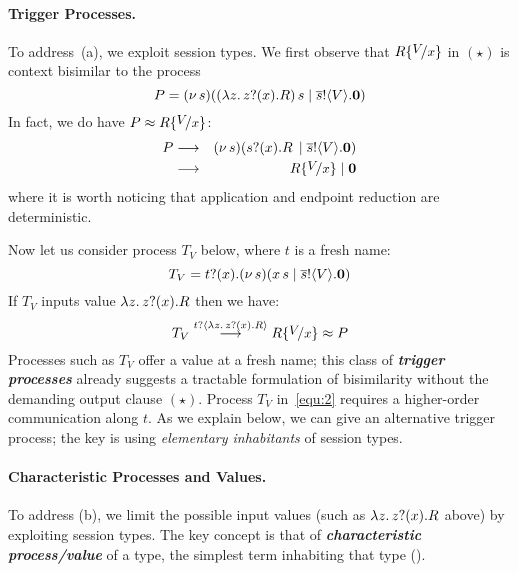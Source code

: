 \paragraph{Trigger Processes.} %
To address~(a), we exploit session types. 
We first 
observe that %
$R\subst{V}{x}$ 
in $(\star)$
is context bisimilar to the process
	$$P = (\nu\, s)((\lambda z.\,z ? (x) .{R})\, {s} \;|\; \overline{s} ! \langle V \rangle . \mathbf{0})$$
In fact,
we do have $P \wbc R\subst{V}{x}$:
\begin{eqnarray*}%
	P & \red &  \newsp{s}{\appl{\binp{s}{x}{R}} \Par \bout{\dual{s}}{V} \inact} \\
	 & \red &  R\subst{V}{x} \Par \inact
\end{eqnarray*}
where it is worth noticing that 
application and endpoint reduction
are deterministic.  

Now let us
consider process $T_{V}$ below, where $t$ is a fresh name:
\begin{equation}\label{equ:2}
T_{V} = t ? (x) . (\nu\, s)(x\, {s} \;|\; \overline{s} ! \langle V \rangle . \mathbf{0}) 
\end{equation}
If $T_{V}$ inputs value $\lambda z.\,z ? (x) . R$ then
we have:
\begin{equation*}\label{equ:2a}
T_{V}
\by{\bactinp{t}{\abs{z}{\binp{z}{x} R}}} 
R\subst{V}{x}
\wbc 
P
\end{equation*}
Processes such as $T_{V}$ 
offer a value at a fresh name; this class of 
{\bf\em trigger processes} 
already suggests a tractable formulation of 
bisimilarity without the demanding 
output 
clause $(\star)$. 
Process $T_{V}$ in~\eqref{equ:2} requires a higher-order communication along $t$.
As we explain below, we can give an alternative trigger process; the key is using \emph{elementary inhabitants} of session types.



\paragraph{Characteristic Processes and Values.}
To address (b), we limit the possible 
input values (such as $\lambda z.\,z ? (x) . R$ above) %
by exploiting session types.
The key concept is that of {\bf \emph{characteristic process/value}}
of a type,  
the 
simplest term inhabiting that type ().

